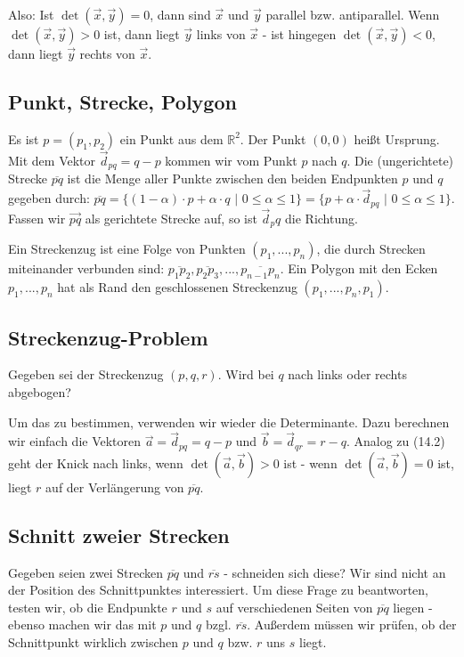 \documentclass[12pt]{article}
\begin{document}
Also: Ist $\det(\vec{x},\vec{y}) = 0$, dann sind $\vec{x}$ und $\vec{y}$ parallel bzw. antiparallel. Wenn $\det(\vec{x},\vec{y}) > 0$ ist, dann liegt $\vec{y}$ links von $\vec{x}$ - ist hingegen $\det(\vec{x},\vec{y}) < 0$, dann liegt $\vec{y}$ rechts von $\vec{x}$.

\subsection{Punkt, Strecke, Polygon}

Es ist $p = (p_1, p_2)$ ein Punkt aus dem $\mathbb{R}^2$. Der Punkt $(0,0)$ heißt Ursprung. Mit dem Vektor $\vec{d}_{pq} = q - p$ kommen wir vom Punkt $p$ nach $q$. Die (ungerichtete) Strecke $\overline{pq}$ ist die Menge aller Punkte zwischen den beiden Endpunkten $p$ und $q$ gegeben durch: $\overline{pq} = \{(1-\alpha) \cdot p + \alpha \cdot q$ $|$ $0 \leq \alpha \leq 1\} = \{p + \alpha \cdot \vec{d}_{pq}$ $|$ $0 \leq \alpha \leq 1\}$. Fassen wir $\vec{pq}$ als gerichtete Strecke auf, so ist $\vec{d}_pq$ die Richtung.

Ein Streckenzug ist eine Folge von Punkten $(p_1, ..., p_n)$, die durch Strecken miteinander verbunden sind: $\overline{p_1p_2}, \overline{p_2p_3}, ..., \overline{p_{n-1}p_n}$. Ein Polygon mit den Ecken $p_1, ..., p_n$ hat als Rand den geschlossenen Streckenzug $(p_1, ..., p_n, p_1)$.

\subsection{Streckenzug-Problem}

Gegeben sei der Streckenzug $(p, q, r)$. Wird bei $q$ nach links oder rechts abgebogen?

Um das zu bestimmen, verwenden wir wieder die Determinante. Dazu berechnen wir einfach die Vektoren $\vec{a} = \vec{d}_{pq} = q - p$ und $\vec{b} = \vec{d}_{qr} = r - q$. Analog zu (14.2) geht der Knick nach links, wenn $\det(\vec{a}, \vec{b}) > 0$ ist - wenn $\det(\vec{a}, \vec{b}) = 0$ ist, liegt $r$ auf der Verlängerung von $\overline{pq}$.

\subsection{Schnitt zweier Strecken}

Gegeben seien zwei Strecken $\overline{pq}$ und $\overline{rs}$ - schneiden sich diese? Wir sind nicht an der Position des Schnittpunktes interessiert. Um diese Frage zu beantworten, testen wir, ob die Endpunkte $r$ und $s$ auf verschiedenen Seiten von $\overline{pq}$ liegen - ebenso machen wir das mit $p$ und $q$ bzgl. $\overline{rs}$. Außerdem müssen wir prüfen, ob der Schnittpunkt wirklich zwischen $p$ und $q$ bzw. $r$ uns $s$ liegt.
\end{document}
